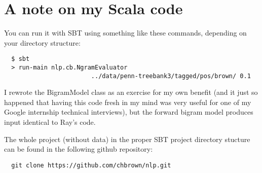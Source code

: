 \documentclass[10pt]{article}
\begin{document}
\section{A note on my Scala code}

You can run it with SBT using something like these commands, depending on your directory structure:

\begin{lstlisting}
  $ sbt
  > run-main nlp.cb.NgramEvaluator
                        ../data/penn-treebank3/tagged/pos/brown/ 0.1
\end{lstlisting}
%
I rewrote the BigramModel class as an exercise for my own benefit (and it just so happened that having this code fresh in my mind was very useful for one of my Google internship technical interviews), but the forward bigram model produces input identical to Ray's code.

The whole project (without data) in the proper SBT project directory stucture can be found in the following github repository:
\begin{lstlisting}
  git clone https://github.com/chbrown/nlp.git
\end{lstlisting}



% 
\end{document}
